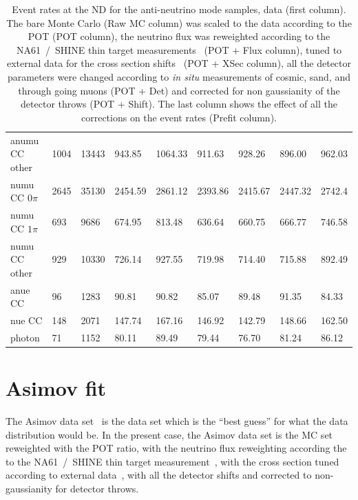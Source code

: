 \begin{table}[ht]
\begin{adjustbox}{center}
\begin{tabular}{lllllllll}
      \Gls{anumu} \Gls{CC} other     &  1004 & 13443 & 943.85  &  1064.33 &  911.63  &  928.26  & 896.00  & 962.03 \\
      \Gls{numu}  \Gls{CC} $0\pi$    &  2645 & 35130 & 2454.59 &  2861.12 &  2393.86 &  2415.67 & 2447.32 & 2742.4 \\
      \Gls{numu}  \Gls{CC} $1\pi$    &  693  & 9686  & 674.95  &  813.48  &  636.64  &  660.75  & 666.77  & 746.58 \\
      \Gls{numu}  \Gls{CC} other     &  929  & 10330 & 726.14  &  927.55  &  719.98  &  714.40  & 715.88  & 892.49 \\
      \Gls{anue}  \Gls{CC}           &  96   & 1283  & 90.81   &  90.82   &  85.07   &  89.48   & 91.35   & 84.33  \\
      \Gls{nue}   \Gls{CC}           &  148  & 2071  & 147.74  &  167.16  &  146.92  &  142.79  & 148.66  & 162.50 \\
      photon                         &  71   & 1152  & 80.11   &  89.49   &  79.44   &  76.70   & 81.24   & 86.12  \\
      \bottomrule
    \end{tabular}
  \end{adjustbox}
  \caption[Event rates at the ND280 for the anti-neutrino mode
  samples]{Event rates at the \Gls{ND} for the anti-neutrino mode
    samples, data (first column). The bare Monte Carlo (Raw \Gls{MC}
    column) was scaled to the data according to the \Gls{POT}
    (\Gls{POT} column), the neutrino flux was reweighted according to
    the NA61~/~SHINE thin target
    measurements~\cite{Abgrall:2011ae,Abgrall:2011ts,Abgrall:2015hmv}
    (\Gls{POT} + Flux column), tuned to external data for the cross
    section shifts~\cite{TN315} (\Gls{POT} + XSec column), all the
    detector parameters were changed according to {\it in situ}
    measurements of cosmic, sand, and through going muons (\Gls{POT} +
    Det) and corrected for non gaussianity of the detector throws
    (\Gls{POT} + Shift). The last column shows the effect of all the
    corrections on the event rates (Prefit column).}
  \label{tab:evratesrhc}
\end{table}
\clearpage

\section{Asimov fit}
\label{sec:asimov}
The \Gls{Asimov} data set~\cite{Cowan:2010js} is the data set which is
the ``best guess'' for what the data distribution would be. In the
present case, the \Gls{Asimov} data set is the \Gls{MC} set reweighted
with the \Gls{POT} ratio, with the neutrino flux reweighting according
the to the NA61~/~SHINE thin target
measurement~\cite{Abgrall:2011ae,Abgrall:2011ts,Abgrall:2015hmv}, with
the cross section tuned according to external data~\cite{TN315}, with
all the detector shifts and corrected to non-gaussianity for detector
throws.

